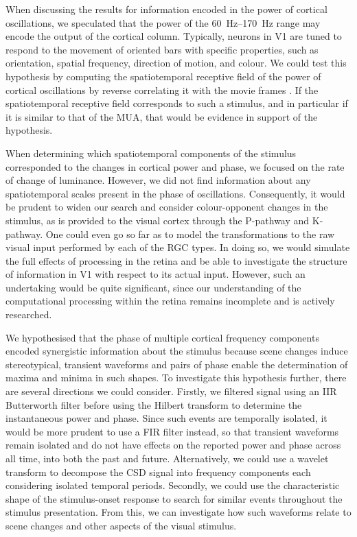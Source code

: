 When discussing the results for information encoded in the power of cortical oscillations, we speculated that the power of the \SIrange{60}{170}{Hz} range may encode the output of the cortical column.
Typically, neurons in \ac{V1} are tuned to respond to the movement of oriented bars with specific properties, such as orientation, spatial frequency, direction of motion, and colour.
We could test this hypothesis by computing the spatiotemporal receptive field of the power of cortical oscillations by reverse correlating it with the movie frames \citep{Theunissen2001}.
If the spatiotemporal receptive field corresponds to such a stimulus, and in particular if it is similar to that of the \ac{MUA}, that would be evidence in support of the hypothesis.

When determining which spatiotemporal components of the stimulus corresponded to the changes in cortical power and phase, we focused on the rate of change of luminance.
However, we did not find information about any spatiotemporal scales present in the phase of oscillations.
Consequently, it would be prudent to widen our search and consider colour-opponent changes in the stimulus, as is provided to the visual cortex through the P-pathway and K-pathway.
One could even go so far as to model the transformations to the raw visual input performed by each of the \ac{RGC} types.
In doing so, we would simulate the full effects of processing in the retina and be able to investigate the structure of information in \ac{V1} with respect to its actual input.
However, such an undertaking would be quite significant, since our understanding of the computational processing within the retina remains incomplete and is actively researched.

We hypothesised that the phase of multiple cortical frequency components encoded synergistic information about the stimulus because scene changes induce stereotypical, transient waveforms and pairs of phase enable the determination of maxima and minima in such shapes.
To investigate this hypothesis further, there are several directions we could consider.
Firstly, we filtered signal using an \ac{IIR} Butterworth filter before using the Hilbert transform to determine the instantaneous power and phase.
Since such events are temporally isolated, it would be more prudent to use a \ac{FIR} filter instead, so that transient waveforms remain isolated and do not have effects on the reported power and phase across all time, into both the past and future.
Alternatively, we could use a wavelet transform to decompose the \ac{CSD} signal into frequency components each considering isolated temporal periods.
Secondly, we could use the characteristic shape of the stimulus-onset response to search for similar events throughout the stimulus presentation.
From this, we can investigate how such waveforms relate to scene changes and other aspects of the visual stimulus.

